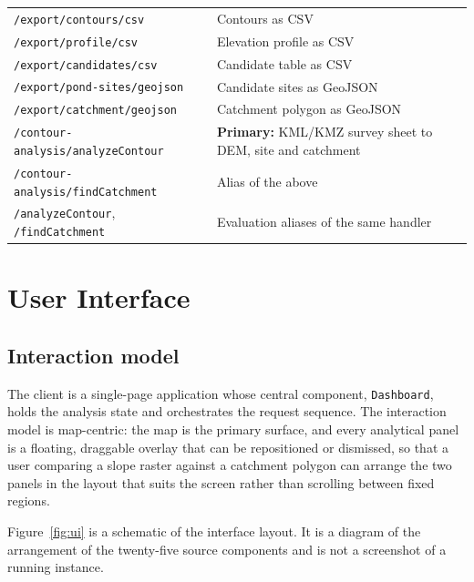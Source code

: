 \documentclass[sigconf,review,10pt]{acmart}
\newcommand{\cb}{\allowbreak}
\newcommand{\codelong}[1]{\texttt{#1}}
\begin{document}
\begin{table}[t]
\begin{tabular}{@{}R{5.6cm}R{10.9cm}@{}}
\codelong{/\cb{}export/\cb{}contours/\cb{}csv} & Contours as CSV \\
\texttt{/export/profile/csv} & Elevation profile as CSV \\
\codelong{/\cb{}export/\cb{}candidates/\cb{}csv} & Candidate table as CSV \\
\codelong{/\cb{}export/\cb{}pond-sites/\cb{}geojson} & Candidate sites as GeoJSON \\
\codelong{/\cb{}export/\cb{}catchment/\cb{}geojson} & Catchment polygon as GeoJSON \\
\codelong{/\cb{}contour-analysis/\cb{}analyzeContour} & \textbf{Primary:} KML/KMZ survey sheet to DEM, site and catchment \cite{kml} \\
\codelong{/\cb{}contour-analysis/\cb{}findCatchment} & Alias of the above \\
\texttt{/analyzeContour}, \texttt{/findCatchment} & Evaluation aliases of the same handler \\
\bottomrule
\end{tabular}
\end{table}

\section{User Interface}
\label{sec:ui}

\subsection{Interaction model}

The client is a single-page application whose central component,
\texttt{Dashboard}, holds the analysis state and orchestrates the request
sequence. The interaction model is map-centric: the map is the primary
surface, and every analytical panel is a floating, draggable overlay that
can be repositioned or dismissed, so that a user comparing a slope raster
against a catchment polygon can arrange the two panels in the layout that
suits the screen rather than scrolling between fixed regions.

Figure~\ref{fig:ui} is a schematic of the interface layout. It is a
diagram of the arrangement of the twenty-five source components and is
not a screenshot of a running instance.
\end{document}
